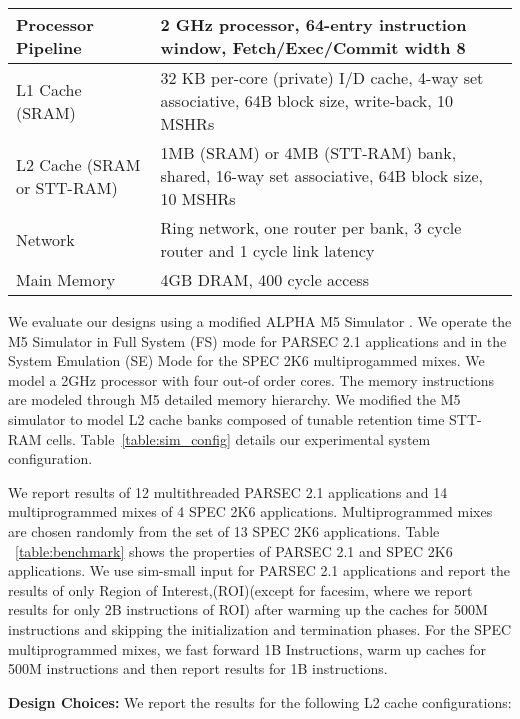 \begin {table*} [t]
 \scriptsize
  \centering
 \caption {{Baseline processor, cache, memory and network configuration}} \label{table:sim_config}
 \begin{tabular}{|l|l|}
 \hline
Processor Pipeline & 2 GHz processor, 64-entry instruction window, Fetch/Exec/Commit width 8 \\
\hline
L1 Cache (SRAM) & 32 KB per-core (private) I/D cache, 4-way set associative, 64B block size, write-back, 10 MSHRs \\
\hline
L2 Cache (SRAM or STT-RAM) &  1MB (SRAM) or 4MB (STT-RAM) bank, shared, 16-way set associative, 64B block size, 10 MSHRs \\
\hline
Network & Ring network, one router per bank, 3 cycle router and 1 cycle link latency \\
\hline
Main Memory & 4GB DRAM, 400 cycle access \\
\hline
\end{tabular}
\end{table*}

We evaluate our designs using a modified ALPHA M5 Simulator \cite{M5} .
We operate the M5 Simulator in Full System (FS) mode for PARSEC 2.1 applications and in the System Emulation (SE) Mode
for the SPEC 2K6 multiprogammed mixes. We model a 2GHz processor with four out-of order cores.
The memory instructions are modeled through M5 detailed memory hierarchy. We modified the M5 simulator to model
L2 cache banks composed of tunable retention time STT-RAM cells. Table~\ref{table:sim_config} details our experimental system configuration.

We report results of 12 multithreaded PARSEC 2.1 applications and 14 multiprogrammed mixes of 4 SPEC 2K6 applications.
Multiprogrammed mixes are chosen randomly from the set of 13 SPEC 2K6 applications.
Table ~\ref{table:benchmark} shows the properties of PARSEC 2.1 and SPEC 2K6 applications.
We use sim-small input for PARSEC 2.1 applications and report the results of only Region of Interest,(ROI)(except for facesim, where we report results for only 2B instructions of ROI)
after warming up the caches for 500M instructions and skipping the initialization and termination phases. For the SPEC multiprogrammed mixes,
we fast forward 1B Instructions, warm up caches for 500M instructions and then report
results for 1B instructions.

\noindent\textbf{Design Choices:}
We report the results for the following L2 cache configurations:


